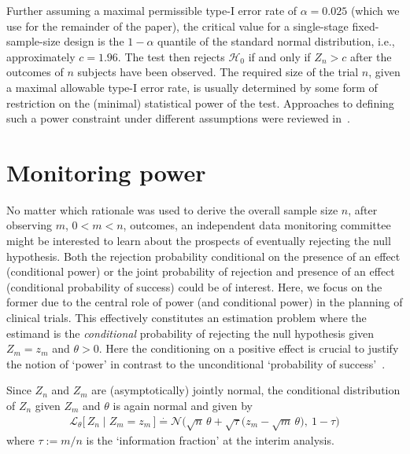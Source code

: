 \documentclass{article}
\begin{document}
Further assuming a maximal permissible type-I error rate of $\alpha=0.025$ (which we use for the remainder of the paper), the critical value for a single-stage fixed-sample-size design is the
$1-\alpha$ quantile of the standard normal distribution, i.e., approximately $c=1.96$.
The test then rejects $\mathcal{H}_0$ if and only if $Z_n > c$ after the outcomes of $n$ subjects have been observed. 
The required size of the trial $n$, given a maximal allowable type-I error
rate, is usually determined by some form of restriction on 
the (minimal) statistical power of the test.
Approaches to defining such a power constraint under 
different assumptions were reviewed in~\citet{kunzmann2020}.



\section{Monitoring power} %
\label{sec:monitoring-power}

No matter which rationale was used to derive the overall sample size $n$,
after observing $m$, $0<m<n$, outcomes,
an independent data monitoring committee might be interested to learn about the prospects of
eventually rejecting the null hypothesis.
Both the rejection probability conditional on the presence of an effect (conditional power) or the joint probability of rejection and presence of an effect (conditional probability of success) could be of interest.
Here, we focus on the former due to the central role of
power (and conditional power) in the planning of clinical trials.
This effectively constitutes an estimation problem where the estimand is 
the \emph{conditional} probability of rejecting the null hypothesis given
$Z_m=z_m$ and $\theta > 0$.
Here the conditioning on a positive effect is crucial to justify the notion
of `power' in contrast to the unconditional `probability of success'~\citep{kunzmann2020}.

Since $Z_n$ and $Z_m$ are (asymptotically) jointly normal, the conditional distribution of $Z_n$ given $Z_m$ and $\theta$ is again normal and 
given by
\begin{align}
    \mathcal{L}_\theta\big[\, Z_n \mid Z_m = z_m \,\big] \stackrel{\cdot}{=} \mathcal{N}\Big(\sqrt{n}\,\theta + \sqrt{\tau}\big(z_{m} - \sqrt{m}\,\theta\big),\ 1 - \tau\Big) \label{eq:joint-distribution}
\end{align}
where $\tau:=m/n$ is the `information fraction' at the interim analysis.
\end{document}
